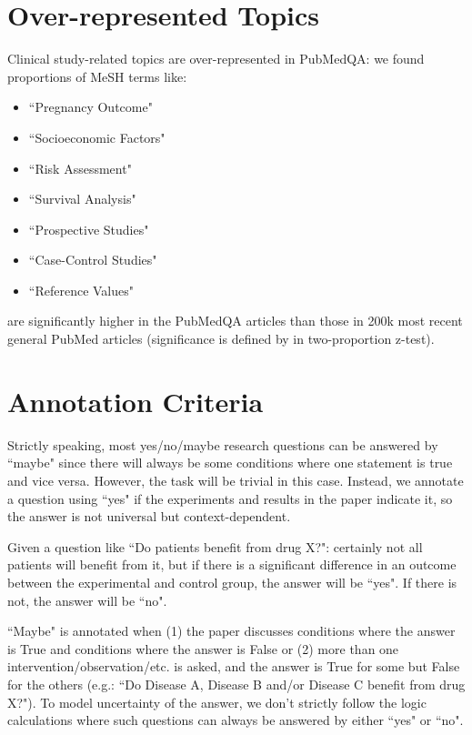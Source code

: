 \documentclass[11pt,a4paper]{article}
\begin{document}
\section{Over-represented Topics} \label{appendix:topic}
Clinical study-related topics are over-represented in PubMedQA: we found proportions of MeSH terms like:
\begin{itemize}
    \item ``Pregnancy Outcome"
    \item ``Socioeconomic Factors"
    \item ``Risk Assessment"
    \item ``Survival Analysis"
    \item ``Prospective Studies"
    \item ``Case-Control Studies"
    \item ``Reference Values"
\end{itemize}
are significantly higher in the PubMedQA articles than those in 200k most recent general PubMed articles (significance is defined by  in two-proportion z-test).

\section{Annotation Criteria}
Strictly speaking, most yes/no/maybe research questions can be answered by ``maybe" since there will always be some conditions where one statement is true and vice versa. However, the task will be trivial in this case. Instead, we annotate a question using ``yes" if the experiments and results in the paper indicate it, so the answer is not universal but context-dependent.

Given a question like ``Do patients benefit from drug X?": certainly not all patients will benefit from it, but if there is a significant difference in an outcome between the experimental and control group, the answer will be ``yes". If there is not, the answer will be ``no".

``Maybe" is annotated when (1) the paper discusses conditions where the answer is True and conditions where the answer is False or (2) more than one intervention/observation/etc. is asked, and the answer is True for some but False for the others (e.g.: ``Do Disease A, Disease B and/or Disease C benefit from drug X?"). To model uncertainty of the answer, we don't strictly follow the logic calculations where such questions can always be answered by either ``yes" or ``no".
\end{document}
